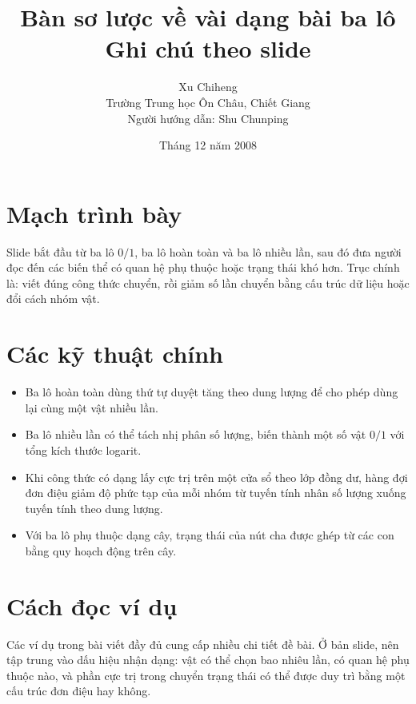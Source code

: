 \documentclass[11pt]{article}
\title{Bàn sơ lược về vài dạng bài ba lô\\{\large Ghi chú theo slide}}
\author{Xu Chiheng\\Trường Trung học Ôn Châu, Chiết Giang\\Người hướng dẫn: Shu Chunping}
\date{Tháng 12 năm 2008}
\begin{document}
\maketitle


\section{Mạch trình bày}

Slide bắt đầu từ ba lô \(0/1\), ba lô hoàn toàn và ba lô nhiều lần, sau đó
đưa người đọc đến các biến thể có quan hệ phụ thuộc hoặc trạng thái khó hơn.
Trục chính là: viết đúng công thức chuyển, rồi giảm số lần chuyển bằng cấu
trúc dữ liệu hoặc đổi cách nhóm vật.

\section{Các kỹ thuật chính}

\begin{itemize}
  \item Ba lô hoàn toàn dùng thứ tự duyệt tăng theo dung lượng để cho phép
  dùng lại cùng một vật nhiều lần.
  \item Ba lô nhiều lần có thể tách nhị phân số lượng, biến thành một số vật
  \(0/1\) với tổng kích thước logarit.
  \item Khi công thức có dạng lấy cực trị trên một cửa sổ theo lớp đồng dư,
  hàng đợi đơn điệu giảm độ phức tạp của mỗi nhóm từ tuyến tính nhân số lượng
  xuống tuyến tính theo dung lượng.
  \item Với ba lô phụ thuộc dạng cây, trạng thái của nút cha được ghép từ các
  con bằng quy hoạch động trên cây.
\end{itemize}

\section{Cách đọc ví dụ}

Các ví dụ trong bài viết đầy đủ cung cấp nhiều chi tiết đề bài. Ở bản slide,
nên tập trung vào dấu hiệu nhận dạng: vật có thể chọn bao nhiêu lần, có quan
hệ phụ thuộc nào, và phần cực trị trong chuyển trạng thái có thể được duy trì
bằng một cấu trúc đơn điệu hay không.
\end{document}
